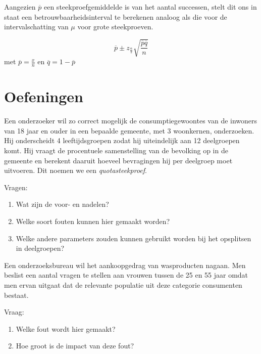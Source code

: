 {Aangezien $\overline{p}$ een steekproefgemiddelde is van het aantal successen, stelt dit ons in staat een betrouwbaarheidsinterval te berekenen analoog als die voor de intervalschatting van $\mu$ voor grote steekproeven.

\begin{definition}
  \[ \overline{p} \pm z_{\frac{\alpha}{2}} \sqrt{\frac{\overline{p}\overline{q}}{n}} \]
  met $\overline{p} = \frac{x}{n}$ en $\overline{q} = 1- \overline{p}$
\end{definition}

\section{Oefeningen}
\label{sec:steekproefonderzoek-oefeningen}

\begin{exercise}
  Een onderzoeker wil zo correct mogelijk de consumptiegewoontes van de inwoners van 18 jaar en ouder in een bepaalde gemeente, met 3 woonkernen, onderzoeken.  Hij onderscheidt 4 leeftijdsgroepen zodat hij uiteindelijk aan 12 deelgroepen komt. Hij vraagt de procentuele samenstelling van de bevolking op in de gemeente en berekent daaruit hoeveel bevragingen hij per deelgroep moet uitvoeren.  Dit noemen we een \emph{quotasteekproef}.
  
  Vragen:
  \begin{enumerate}[label=\alph*.]
    \item Wat zijn de voor- en nadelen?
    \item Welke soort fouten kunnen hier gemaakt worden?
    \item Welke andere parameters zouden kunnen gebruikt worden bij het opsplitsen in deelgroepen?
  \end{enumerate}
\end{exercise}

\begin{exercise}
  Een onderzoeksbureau wil het aankoopgedrag van wasproducten nagaan. Men beslist een aantal vragen te stellen aan vrouwen tussen de 25 en 55 jaar omdat men ervan uitgaat dat de relevante populatie uit deze categorie consumenten bestaat. 
  
  Vraag:
  
  \begin{enumerate}[label=\alph*.]
    \item Welke fout wordt hier gemaakt? 
    \item Hoe groot is de impact van deze fout?
  \end{enumerate}
\end{exercise}

}
